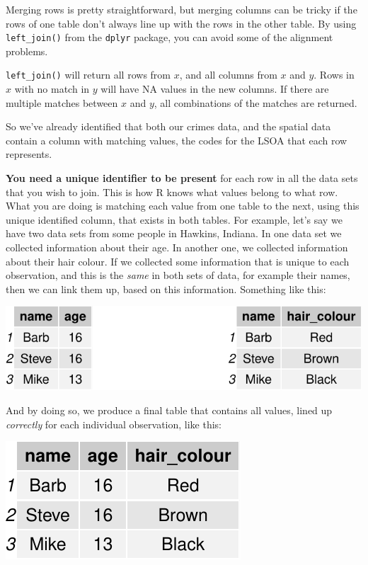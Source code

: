 \documentclass[
]{book}
\begin{document}
Merging rows is pretty straightforward, but merging columns can be tricky if the rows of one table don't always line up with the rows in the other table. By using \texttt{left\_join()} from the \texttt{dplyr} package, you can avoid some of the alignment problems.

\texttt{left\_join()} will return all rows from \(x\), and all columns from \(x\) and \(y\). Rows in \(x\) with no match in \(y\) will have NA values in the new columns. If there are multiple matches between \(x\) and \(y\), all combinations of the matches are returned.

So we've already identified that both our crimes data, and the spatial data contain a column with matching values, the codes for the LSOA that each row represents.

\textbf{You need a unique identifier to be present} for each row in all the data sets that you wish to join. This is how R knows what values belong to what row. What you are doing is matching each value from one table to the next, using this unique identified column, that exists in both tables. For example, let's say we have two data sets from some people in Hawkins, Indiana. In one data set we collected information about their age. In another one, we collected information about their hair colour. If we collected some information that is unique to each observation, and this is the \emph{same} in both sets of data, for example their names, then we can link them up, based on this information. Something like this:

\includegraphics{crime_mapping_files/figure-latex/unnamed-chunk-26-1.pdf}

And by doing so, we produce a final table that contains all values, lined up \emph{correctly} for each individual observation, like this:

\includegraphics{crime_mapping_files/figure-latex/unnamed-chunk-27-1.pdf}
\end{document}
